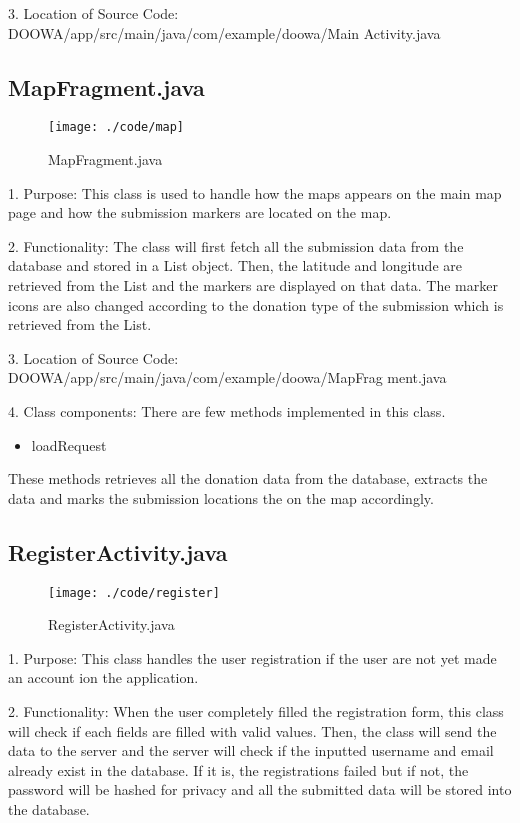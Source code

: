\documentclass[conference]{IEEEtran}
\begin{document}
3. Location of Source Code: DOOWA/app/src/main/java/com/example/doowa/Main Activity.java\break
\break
\subsection{MapFragment.java}
\begin{figure}[h!]
\texttt{[image: ./code/map]}
\centering
\caption{MapFragment.java}
\end{figure}
1. Purpose: This class is used to handle how the maps appears on the main map page and how the submission markers are located on the map.\break
\par 2. Functionality: The class will first fetch all the submission data from the database and stored in a List object. Then, the latitude and longitude are retrieved from the List and the markers are displayed on that data. The marker icons are also changed according to the donation type of the submission which is retrieved from the List.\break

3. Location of Source Code: DOOWA/app/src/main/java/com/example/doowa/MapFrag ment.java\break

4. Class components: There are few methods implemented in this class.
\begin{itemize}
\item loadRequest
\end{itemize}
These methods retrieves all the donation data from the database, extracts the data and marks the submission locations the on the map accordingly.
\break
\subsection{RegisterActivity.java}
\begin{figure}[h!]
\texttt{[image: ./code/register]}
\centering
\caption{RegisterActivity.java}
\end{figure}
1. Purpose: This class handles the user registration if the user are not yet made an account ion the application.\break
\par 2. Functionality: When the user completely filled the registration form, this class will check if each fields are filled with valid values. Then, the class will send the data to the server and the server will check if the inputted username and email already exist in the database. If it is, the registrations failed but if not, the password will be hashed for privacy and all the submitted data will be stored into the database. \break
\end{document}
